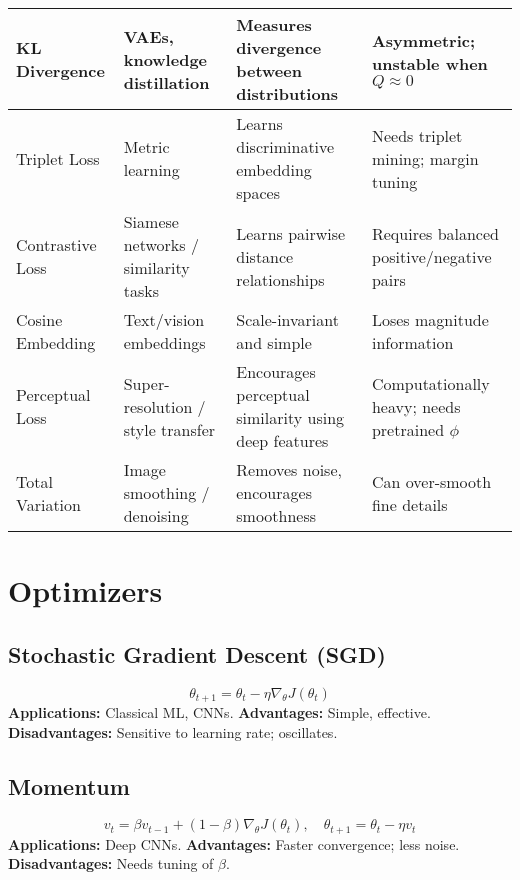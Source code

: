 \documentclass[11pt]{article}
\begin{document}
\begin{tabular}{|p{2.8cm}|p{2.8cm}|p{5cm}|p{5cm}|}
KL Divergence & VAEs, knowledge distillation &
Measures divergence between distributions &
Asymmetric; unstable when $Q\approx0$ \\ \hline

Triplet Loss & Metric learning &
Learns discriminative embedding spaces &
Needs triplet mining; margin tuning \\ \hline

Contrastive Loss & Siamese networks / similarity tasks &
Learns pairwise distance relationships &
Requires balanced positive/negative pairs \\ \hline

Cosine Embedding & Text/vision embeddings &
Scale-invariant and simple &
Loses magnitude information \\ \hline

Perceptual Loss & Super-resolution / style transfer &
Encourages perceptual similarity using deep features &
Computationally heavy; needs pretrained $\phi$ \\ \hline

Total Variation & Image smoothing / denoising &
Removes noise, encourages smoothness &
Can over-smooth fine details \\ \hline
\end{tabular}


\section{Optimizers}

\subsection{Stochastic Gradient Descent (SGD)}
\[
\theta_{t+1} = \theta_t - \eta \nabla_\theta J(\theta_t)
\]
\textbf{Applications:} Classical ML, CNNs.  
\textbf{Advantages:} Simple, effective.  
\textbf{Disadvantages:} Sensitive to learning rate; oscillates.

\subsection{Momentum}
\[
v_t = \beta v_{t-1} + (1 - \beta)\nabla_\theta J(\theta_t), \quad
\theta_{t+1} = \theta_t - \eta v_t
\]
\textbf{Applications:} Deep CNNs.  
\textbf{Advantages:} Faster convergence; less noise.  
\textbf{Disadvantages:} Needs tuning of $\beta$.
\end{document}
